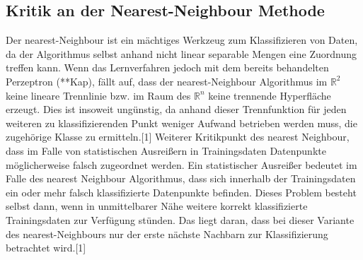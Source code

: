 \documentclass[a4paper]{scrartcl}
\begin{document}
\begin{multicols}{2}
                        \subsection{Kritik an der Nearest-Neighbour Methode}
                            Der nearest-Neighbour ist ein mächtiges Werkzeug zum Klassifizieren von Daten, da der Algorithmus selbst anhand nicht linear separable Mengen eine Zuordnung treffen kann. Wenn das Lernverfahren jedoch mit dem bereits behandelten Perzeptron (**Kap), fällt auf, dass der nearest-Neighbour Algorithmus im $\mathbb{R}^2$ keine lineare Trennlinie bzw. im Raum des $\mathbb{R}^n$ keine trennende Hyperfläche erzeugt. Dies ist insoweit ungünstig, da anhand dieser Trennfunktion für jeden weiteren zu klassifizierenden Punkt weniger Aufwand betrieben werden muss, die zugehörige Klasse zu ermitteln.[1] 
                            Weiterer Kritikpunkt des nearest Neighbour, dass im Falle von statistischen Ausreißern in Trainingsdaten Datenpunkte möglicherweise falsch zugeordnet werden. Ein statistischer Ausreißer bedeutet im Falle des nearest Neighbour Algorithmus, dass sich innerhalb der Trainingsdaten ein oder mehr falsch klassifizierte Datenpunkte befinden. Dieses Problem besteht selbst dann, wenn in unmittelbarer Nähe weitere korrekt klassifizierte Trainingsdaten zur Verfügung stünden. Das liegt daran, dass bei dieser Variante des nearest-Neighbours nur der erste nächste Nachbarn zur Klassifizierung betrachtet wird.[1]
                         

\end{multicols}
\end{document}
